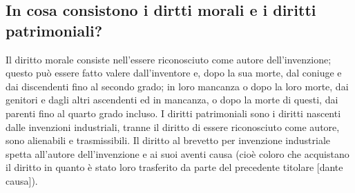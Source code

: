 \subsection{In cosa consistono i dirtti morali e i diritti patrimoniali?}
Il diritto morale consiste nell'essere riconosciuto come autore dell'invenzione; questo può essere fatto valere
dall'inventore e, dopo la sua morte, dal coniuge e dai discendenti fino al secondo grado; in loro mancanza o dopo
la loro morte, dai genitori e dagli altri ascendenti ed in mancanza, o dopo la morte di questi, dai parenti fino al quarto
grado incluso. \newline
I diritti patrimoniali sono i diritti nascenti dalle invenzioni industriali, tranne il diritto di essere riconosciuto come
autore, sono alienabili e trasmissibili.\newline
Il diritto al brevetto per invenzione industriale spetta all'autore dell'invenzione e ai suoi aventi causa (cioè coloro che acquistano il diritto
in quanto è stato loro trasferito da parte del precedente titolare [dante causa]).

